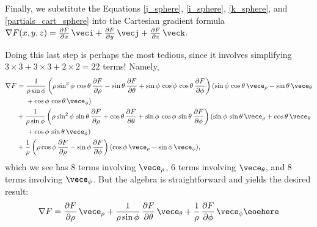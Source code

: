 {{Finally, we substitute the Equations \eqref{j_sphere}, \eqref{i_sphere}, \eqref{k_sphere}, and \eqref{partials_cart_sphere} into the Cartesian gradient formula $\nabla F(x,y,z) = \frac{\partial F}{\partial x}\,\veci + \frac{\partial F}{\partial y}\,\vecj + \frac{\partial F}{\partial z}\,\veck$.

Doing this last step is perhaps the most tedious, since it involves simplifying $3 \times 3 + 3 \times 3 + 2 \times 2 = 22$ terms! Namely,
\begin{align*}
 \nabla F &= \frac{1}{\rho\sin\phi}\left( \rho\sin^2\phi\,\cos\theta\,
  \frac{\partial F}{\partial \rho} - \sin\theta\,\frac{\partial F}{\partial \theta} + \sin\phi\,\cos\phi\,\cos\theta\,
  \frac{\partial F}{\partial \phi} \right) (\sin\phi\,\cos\theta\,\vece_{\rho} - \sin\theta\,\vece_{\theta}\\
  &\mathrel{\phantom{=}} {} + \cos\phi\,\cos\theta\,\vece_{\phi})\\
  &+ \frac{1}{\rho\sin\phi}\left( \rho\sin^2\phi\,\sin\theta\,
  \frac{\partial F}{\partial \rho} + \cos\theta\,\frac{\partial F}{\partial \theta} + \sin\phi\,\cos\phi\,\sin\theta\,
  \frac{\partial F}{\partial \phi} \right) (\sin\phi\,\sin\theta\,\vece_{\rho} + \cos\theta\,\vece_{\theta}\\
  &\mathrel{\phantom{=}} {} + \cos\phi\,\sin\theta\,\vece_{\phi})\\
  &+ \frac{1}{\rho}\left( \rho\cos\phi\,\frac{\partial F}{\partial \rho} -
  \sin\phi\,\frac{\partial F}{\partial \phi} \right) (\cos\phi\,\vece_{\rho} - \sin\phi\,\vece_{\phi}) ,
\end{align*}
which we see has $8$ terms involving $\vece_{\rho}$, $6$ terms involving $\vece_{\theta}$, and $8$ terms involving $\vece_{\phi}$. But the algebra is straightforward and yields the desired result:
\[
 \nabla F = \frac{\partial F}{\partial \rho}\,\vece_{\rho} +
  \frac{1}{\rho \sin \phi}\,\frac{\partial F}{\partial \theta}\,\vece_{\theta} +
  \frac{1}{\rho}\,\frac{\partial F}{\partial \phi}\,\vece_{\phi}\eoehere
\]}

}
